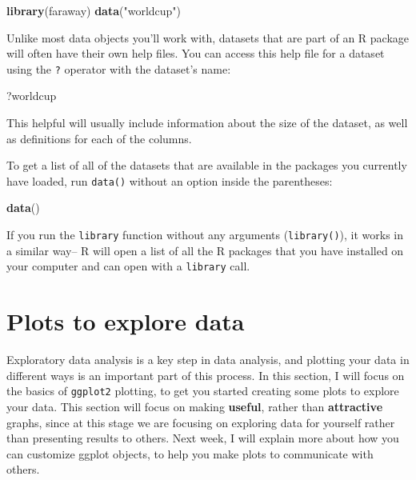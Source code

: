 \documentclass[]{book}
\makeatletter
\newenvironment{Shaded}{\begin{snugshade}}{\end{snugshade}}
\newcommand{\KeywordTok}[1]{\textcolor[rgb]{0.13,0.29,0.53}{\textbf{#1}}}
\newcommand{\StringTok}[1]{\textcolor[rgb]{0.31,0.60,0.02}{#1}}
\newcommand{\NormalTok}[1]{#1}
\newenvironment{kframe}{%
\medskip{}
\setlength{\fboxsep}{.8em}
 \def\at@end@of@kframe{}%
 \ifinner\ifhmode%
  \def\at@end@of@kframe{\end{minipage}}%
  \begin{minipage}{\columnwidth}%
 \fi\fi%
 \def\FrameCommand##1{\hskip\@totalleftmargin \hskip-\fboxsep
 \colorbox{shadecolor}{##1}\hskip-\fboxsep
     \hskip-\linewidth \hskip-\@totalleftmargin \hskip\columnwidth}%
 \MakeFramed {\advance\hsize-\width
   \@totalleftmargin\z@ \linewidth\hsize
   \@setminipage}}%
 {\par\unskip\endMakeFramed%
 \at@end@of@kframe}
\renewenvironment{Shaded}{\begin{kframe}}{\end{kframe}}
\newenvironment{rmdblock}[1]
  {
  \begin{itemize}
  \renewcommand{\labelitemi}{
    \raisebox{-.7\height}[0pt][0pt]{
      {\setkeys{Gin}{width=3em,keepaspectratio}\texttt{[image: images/\#1]}}
    }
  }
  \setlength{\fboxsep}{1em}
  \begin{kframe}
  \item
  }
  {
  \end{kframe}
  \end{itemize}
  }
\newenvironment{rmdnote}
  {\begin{rmdblock}{note}}
  {\end{rmdblock}}
\theoremstyle{definition}
\theoremstyle{definition}
\theoremstyle{definition}
\theoremstyle{remark}
\makeatother
\begin{document}
\begin{Shaded}
\begin{Highlighting}[]
\KeywordTok{library}\NormalTok{(faraway)}
\KeywordTok{data}\NormalTok{(}\StringTok{"worldcup"}\NormalTok{)}
\end{Highlighting}
\end{Shaded}

Unlike most data objects you'll work with, datasets that are part of an
R package will often have their own help files. You can access this help
file for a dataset using the \texttt{?} operator with the dataset's
name:

\begin{Shaded}
\begin{Highlighting}[]
\NormalTok{?worldcup}
\end{Highlighting}
\end{Shaded}

This helpful will usually include information about the size of the
dataset, as well as definitions for each of the columns.

To get a list of all of the datasets that are available in the packages
you currently have loaded, run \texttt{data()} without an option inside
the parentheses:

\begin{Shaded}
\begin{Highlighting}[]
\KeywordTok{data}\NormalTok{()}
\end{Highlighting}
\end{Shaded}

\begin{rmdnote}
If you run the \texttt{library} function without any arguments
(\texttt{library()}), it works in a similar way-- R will open a list of
all the R packages that you have installed on your computer and can open
with a \texttt{library} call.
\end{rmdnote}

\section{Plots to explore data}\label{plots-to-explore-data}

Exploratory data analysis is a key step in data analysis, and plotting
your data in different ways is an important part of this process. In
this section, I will focus on the basics of \texttt{ggplot2} plotting,
to get you started creating some plots to explore your data. This
section will focus on making \textbf{useful}, rather than
\textbf{attractive} graphs, since at this stage we are focusing on
exploring data for yourself rather than presenting results to others.
Next week, I will explain more about how you can customize ggplot
objects, to help you make plots to communicate with others.
\end{document}
